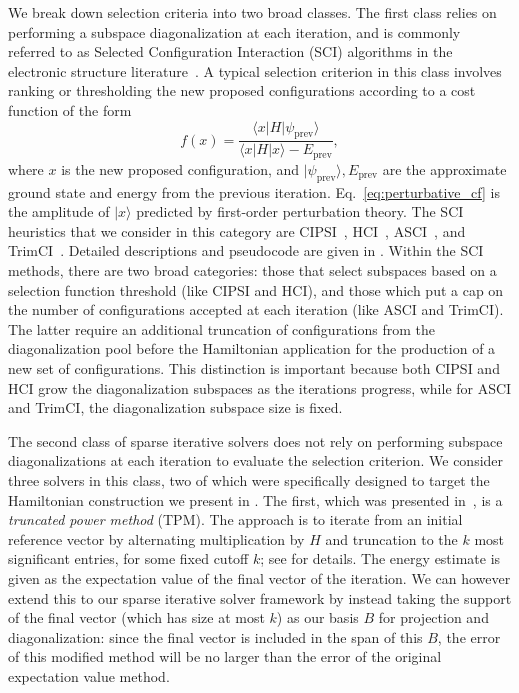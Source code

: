 \documentclass[
  reprint,            %
  amsmath,amssymb,
  aps,
  superscriptaddress, %
  longbibliography
]{revtex4-2}
\theoremstyle{definition}
\begin{document}
We break down selection criteria into two broad classes.
The first class relies on performing a subspace diagonalization at each iteration, and is commonly referred to as Selected Configuration Interaction (SCI) algorithms in the electronic structure literature~\cite{holmes2016heat_SCI, zhang2025TrimCI_SCI, holmes2016efficient_SCI, tubman2016deterministic_SCI, sharma2017semistochastic_SCI, Huron_1973_CIPSI}.
A typical selection criterion in this class involves ranking or thresholding the new proposed configurations according to a cost function of the form 
\begin{equation}
\label{eq:perturbative_cf}
    f(x) = \frac{\langle x|H|\psi_\mathrm{prev}\rangle}{\langle x|H|x\rangle-E_\mathrm{prev}},
\end{equation}
where $x$ is the new proposed configuration, and $|\psi_\mathrm{prev}\rangle,E_\mathrm{prev}$ are the approximate ground state and energy from the previous iteration.
Eq.~\eqref{eq:perturbative_cf} is the amplitude of $|x\rangle$ predicted by first-order perturbation theory.
The SCI heuristics that we consider in this category are CIPSI~\cite{Huron_1973_CIPSI}, HCI~\cite{holmes2016heat_SCI, sharma2017semistochastic_SCI, holmes2016efficient_SCI}, ASCI~\cite{tubman2016deterministic_SCI}, and TrimCI~\cite{zhang2025TrimCI_SCI}.
Detailed descriptions and pseudocode are given in . Within the SCI methods, there are two broad categories: those that select subspaces based on a selection function threshold (like CIPSI and HCI), and those which put a cap on the number of configurations accepted at each iteration (like ASCI and TrimCI). The latter require an additional truncation of configurations from the diagonalization pool before the Hamiltonian application for the production of a new set of configurations. This distinction is important because both CIPSI and HCI grow the diagonalization subspaces as the iterations progress, while for ASCI and TrimCI, the diagonalization subspace size is fixed.

The second class of sparse iterative solvers does not rely on performing subspace diagonalizations at each iteration to evaluate the selection criterion.
We consider three solvers in this class, two of which were specifically designed to target the Hamiltonian construction we present in .
The first, which was presented in~\cite{yuan2013truncated}, is a \emph{truncated power method} (TPM).
The approach is to iterate from an initial reference vector by alternating multiplication by $H$ and truncation to the $k$ most significant entries, for some fixed cutoff $k$; see  for details.
The energy estimate is given as the expectation value of the final vector of the iteration.
We can however extend this to our sparse iterative solver framework by instead taking the support of the final vector (which has size at most $k$) as our basis $B$ for projection and diagonalization: since the final vector is included in the span of this $B$, the error of this modified method will be no larger than the error of the original expectation value method.
\end{document}
